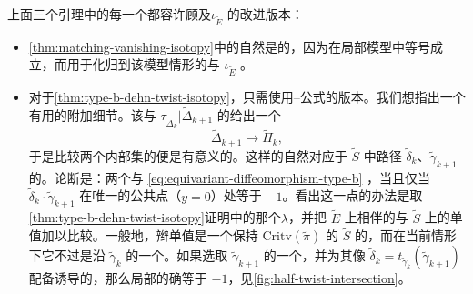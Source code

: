 \begin{remark}\label{thm:involution-equivariant-remarks}
上面三个引理中的每一个都容许顾及\trInvolution{}$\iota_{\widetilde{E}}$ 的改进版本：
\begin{itemize}
\item \cref{thm:matching-vanishing-isotopy}中的\trIsotopy{}自然是\trEquivariant{}的，因为在局部模型中等号成立，而用于化归到该模型情形的\trDeformation{}与 $\iota_{\widetilde{E}}$ \trCompatible。
\item 对于\cref{thm:type-b-dehn-twist-isotopy}，只需使用\trPicard--\trLefschetz{}公式的\trEquivariant{}版本。我们想指出一个有用的附加细节。该\trIsotopy{}与 $\tau_{\widetilde{\Delta}_k}|\widetilde{\Delta}_{k+1}$ 的\trComposition{}给出一个\trEquivariant{}\trDiffeomorphism
\begin{equation}\label{eq:equivariant-diffeomorphism-type-b}
\widetilde{\Delta}_{k+1}\longrightarrow\widetilde{\Pi}_k,
\end{equation}
于是比较两个\trSphere{}内部\trFixedPoint{}集的\trCoorientation{}便是有意义的。这样的\trCoorientation{}自然对应于 $\widetilde{S}$ 中路径 $\tilde{\delta}_k$、$\tilde{\gamma}_{k+1}$ 的\trOrientation。论断是：两个\trCoorientation{}与 \eqref{eq:equivariant-diffeomorphism-type-b} \trCompatible，当且仅当\trIntersectionNumber{}$\tilde{\delta}_k\cdot\tilde{\gamma}_{k+1}$ 在唯一的公共点（$y=0$）处等于 $-1$。看出这一点的办法是取\cref{thm:type-b-dehn-twist-isotopy}证明中的那个\trLoop{}$\lambda$，并把 $\widetilde{E}$ 上相伴的\trMonodromy{}与 $\widetilde{S}$ 上的\trBraid{}单值加以比较。一般地，辫单值是一个保持 $\mathrm{Critv}(\tilde{\pi})$ 的 $\widetilde{S}$ 的\trDiffeomorphism，而在当前情形下它不过是沿 $\tilde{\gamma}_k$ 的一个\trHalfTwist。如果选取 $\tilde{\gamma}_{k+1}$ 的一个\trOrientation，并为其像 $\tilde{\delta}_k=t_{\tilde{\gamma}_k}(\tilde{\gamma}_{k+1})$ 配备诱导的\trOrientation，那么局部\trIntersectionNumber{}的确等于 $-1$，见\cref{fig:half-twist-intersection}。
\begin{figure}[htbp]
\centering
{}
\end{figure}
\end{itemize}
\end{remark}
